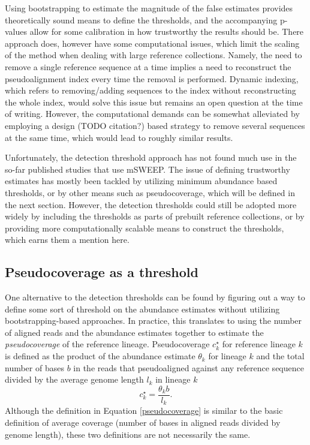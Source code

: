 \documentclass[officiallayout]{tktla}
\begin{document}
Using bootstrapping to estimate the magnitude of the false estimates
provides theoretically sound means to define the thresholds, and the
accompanying p-values allow for some calibration in how trustworthy
the results should be. There approach does, however have some
computational issues, which limit the scaling of the method when
dealing with large reference collections. Namely, the need to remove a
single reference sequence at a time implies a need to reconstruct the
pseudoalignment index every time the removal is performed. Dynamic
indexing, which refers to removing/adding sequences to the index
without reconstructing the whole index, would solve this issue but
remains an open question at the time of writing. However, the
computational demands can be somewhat alleviated by employing a design
(TODO citation?) based strategy to remove several sequences at the
same time, which would lead to roughly similar results.

Unfortunately, the detection threshold approach has not found much use
in the so-far published studies that use mSWEEP. The issue of defining
trustworthy estimates has mostly been tackled by utilizing minimum
abundance based thresholds, or by other means such as pseudocoverage,
which will be defined in the next section. However, the detection
thresholds could still be adopted more widely by including the
thresholds as parts of prebuilt reference collections, or by providing
more computationally scalable means to construct the thresholds, which
earns them a mention here.

\subsection{Pseudocoverage as a threshold}
One alternative to the detection thresholds can be found by figuring
out a way to define some sort of threshold on the abundance estimates
without utilizing bootstrapping-based approaches. In practice, this
translates to using the number of aligned reads and the abundance
estimates together to estimate the \textit{pseudocoverage} of the
reference lineage. Pseudocoverage $c^{\star}_{k}$ for reference
lineage $k$ is defined as the product of the abundance estimate
$\theta_{k}$ for lineage $k$ and the total number of bases $b$ in the
reads that pseudoaligned against any reference sequence divided by the
average genome length $l_{k}$ in lineage $k$
\begin{equation}
  \label{pseudocoverage}
  c_{k}^{\star} = \frac{\theta_{k}b}{l_{k}}.
\end{equation}
Although the definition in Equation \ref{pseudocoverage} is similar to
the basic definition of average coverage (number of bases in aligned
reads divided by genome length), these two definitions are not
necessarily the same.
\end{document}
